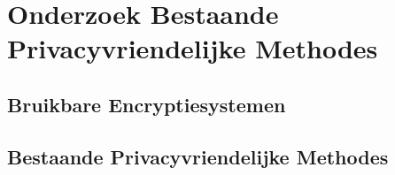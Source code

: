 \chapter{Onderzoek Bestaande Privacyvriendelijke Methodes}
\label{onderzoek}

\section{Bruikbare Encryptiesystemen}


\pagebreak
\section{Bestaande Privacyvriendelijke Methodes}





\pagebreak

\pagebreak

\pagebreak


